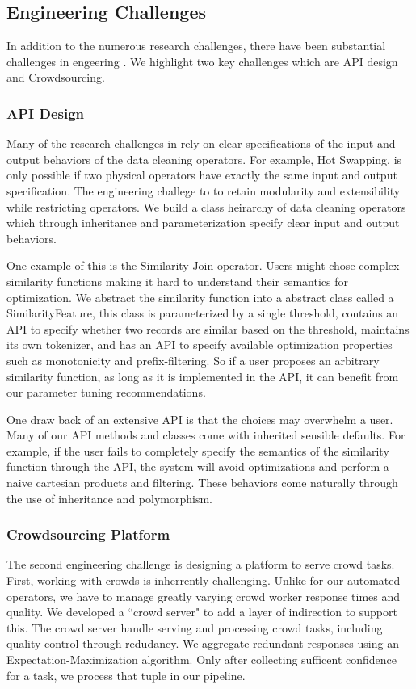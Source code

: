 \subsection{Engineering Challenges}
In addition to the numerous research challenges, there have been substantial challenges in engeering \sys.
We highlight two key challenges which are API design and Crowdsourcing.

\subsubsection{API Design}
Many of the research challenges in \sys rely on clear specifications of the input and output behaviors of
the data cleaning operators.
For example, Hot Swapping, is only possible if two physical operators have exactly the same input and output specification.
The engineering challege to to retain modularity and extensibility while restricting operators.
We build a class heirarchy of data cleaning operators which through inheritance and parameterization specify clear input and output behaviors.

One example of this is the Similarity Join operator.
Users might chose complex similarity functions making it hard to understand their semantics for optimization.
We abstract the similarity function into a abstract class called a \textsf{SimilarityFeature}, this class is parameterized
by a single threshold, contains an API to specify whether two records are similar based on the threshold, maintains its
own tokenizer, and has an API to specify available optimization properties such as monotonicity and prefix-filtering.
So if a user proposes an arbitrary similarity function, as long as it is implemented in the API, it can benefit from our
parameter tuning recommendations.

One draw back of an extensive API is that the choices may overwhelm a user.
Many of our API methods and classes come with inherited sensible defaults.
For example, if the user fails to completely specify the semantics of the similarity function through the API, 
the system will avoid optimizations and perform a naive cartesian products and filtering.
These behaviors come naturally through the use of inheritance and polymorphism.

\subsubsection{Crowdsourcing Platform}
The second engineering challenge is designing a platform to serve crowd tasks.
First, working with crowds is inherrently challenging.
Unlike for our automated operators, we have to manage greatly varying crowd worker
response times and quality.
We developed a ``crowd server" to add a layer of indirection to support this.
The crowd server handle serving and processing crowd tasks, including quality control through redudancy.
We aggregate redundant responses using an Expectation-Maximization algorithm.
Only after collecting sufficent confidence for a task, we process that tuple in our pipeline.

